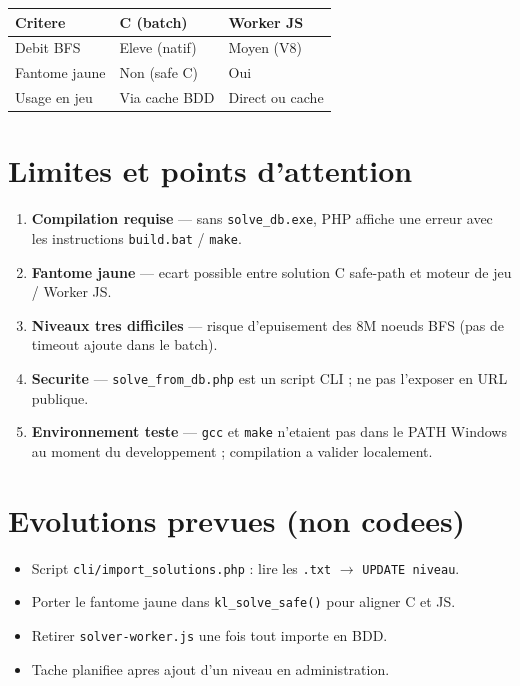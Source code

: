 \documentclass[11pt,a4paper]{article}
\begin{document}
\begin{table}[h]
\centering
\small
\begin{tabular}{@{}lll@{}}
\toprule
\textbf{Critere} & \textbf{C (batch)} & \textbf{Worker JS} \\
\midrule
Debit BFS & Eleve (natif) & Moyen (V8) \\
Fantome jaune & Non (safe C) & Oui \\
Usage en jeu & Via cache BDD & Direct ou cache \\
\bottomrule
\end{tabular}
\end{table}

\section{Limites et points d'attention}

\begin{enumerate}
    \item \textbf{Compilation requise} --- sans \texttt{solve\_db.exe}, PHP affiche une erreur avec les instructions \texttt{build.bat} / \texttt{make}.
    \item \textbf{Fantome jaune} --- ecart possible entre solution C safe-path et moteur de jeu / Worker JS.
    \item \textbf{Niveaux tres difficiles} --- risque d'epuisement des 8M noeuds BFS (pas de timeout ajoute dans le batch).
    \item \textbf{Securite} --- \texttt{solve\_from\_db.php} est un script CLI ; ne pas l'exposer en URL publique.
    \item \textbf{Environnement teste} --- \texttt{gcc} et \texttt{make} n'etaient pas dans le PATH Windows au moment du developpement ; compilation a valider localement.
\end{enumerate}

\section{Evolutions prevues (non codees)}

\begin{itemize}
    \item Script \texttt{cli/import\_solutions.php} : lire les \texttt{.txt} $\rightarrow$ \texttt{UPDATE niveau}.
    \item Porter le fantome jaune dans \texttt{kl\_solve\_safe()} pour aligner C et JS.
    \item Retirer \texttt{solver-worker.js} une fois tout importe en BDD.
    \item Tache planifiee apres ajout d'un niveau en administration.
\end{itemize}
\end{document}
